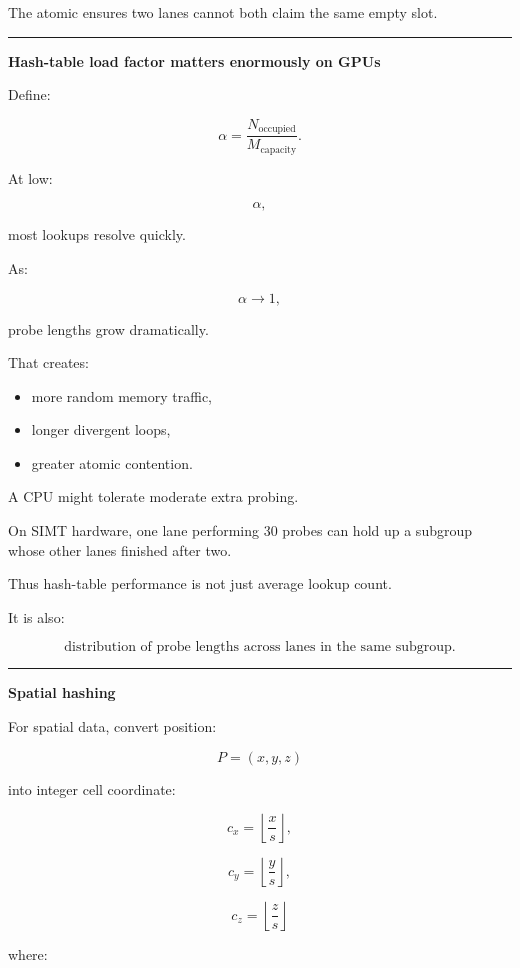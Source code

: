 The atomic ensures two lanes cannot both claim the same empty slot.

\begin{center}\rule{0.5\linewidth}{0.5pt}\end{center}

\textbf{Hash-table load factor matters enormously on GPUs}

Define:

\[
\boxed{
\alpha=
\frac{
N_{\text{occupied}}
}{
M_{\text{capacity}}
}.
}
\]

At low:

\[
\alpha,
\]

most lookups resolve quickly.

As:

\[
\alpha\rightarrow1,
\]

probe lengths grow dramatically.

That creates:

\begin{itemize}
\tightlist
\item
  more random memory traffic,
\item
  longer divergent loops,
\item
  greater atomic contention.
\end{itemize}

A CPU might tolerate moderate extra probing.

On SIMT hardware, one lane performing 30 probes can hold up a subgroup whose other lanes finished after two.

Thus hash-table performance is not just average lookup count.

It is also:

\[
\boxed{
\text{distribution of probe lengths across lanes in the same subgroup}.
}
\]

\begin{center}\rule{0.5\linewidth}{0.5pt}\end{center}

\textbf{Spatial hashing}

For spatial data, convert position:

\[
P=(x,y,z)
\]

into integer cell coordinate:

\[
c_x=
\left\lfloor
\frac{x}{s}
\right\rfloor,
\]

\[
c_y=
\left\lfloor
\frac{y}{s}
\right\rfloor,
\]

\[
c_z=
\left\lfloor
\frac{z}{s}
\right\rfloor
\]

where:

